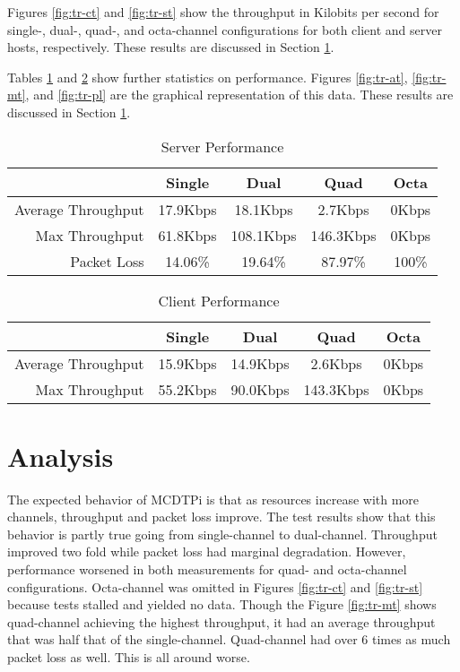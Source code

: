 Figures \ref{fig:tr-ct} and \ref{fig:tr-st} show the throughput in Kilobits per second for single-, dual-, quad-, and octa-channel configurations for both client and server hosts, respectively. These results are discussed in Section \ref{sec:anlys}.

Tables \ref{tab:server-perf} and \ref{tab:client-perf} show further statistics on performance. Figures \ref{fig:tr-at}, \ref{fig:tr-mt}, and \ref{fig:tr-pl} are the graphical representation of this data. These results are discussed in Section \ref{sec:anlys}.

\begin{table}[H]
\centering
\caption{Server Performance}
\label{tab:server-perf}
\begin{tabular}{rcccc}
\multicolumn{1}{c}{} & Single    & Dual      & Quad       & Octa  \\
\hline
Average Throughput   & 17.9Kbps  & 18.1Kbps  & 2.7Kbps    & 0Kbps \\
\hline
Max Throughput       & 61.8Kbps  & 108.1Kbps & 146.3Kbps  & 0Kbps \\
\hline
Packet Loss          & 14.06\%   & 19.64\%   & 87.97\%    & 100\%
\end{tabular}
\end{table}

\begin{table}[H]
\centering
\caption{Client Performance}
\label{tab:client-perf}
\begin{tabular}{rcccc}
\multicolumn{1}{c}{} & Single    & Dual      & Quad       & Octa  \\
\hline
Average Throughput   & 15.9Kbps  & 14.9Kbps  & 2.6Kbps    & 0Kbps \\
\hline
Max Throughput       & 55.2Kbps  & 90.0Kbps  & 143.3Kbps  & 0Kbps
\end{tabular}
\end{table}


\section{Analysis}\label{sec:anlys}

The expected behavior of MCDTPi is that as resources increase with more channels, throughput and packet loss improve. The test results show that this behavior is partly true going from single-channel to dual-channel. Throughput improved two fold while packet loss had marginal degradation. However, performance worsened in both measurements for quad- and octa-channel configurations. Octa-channel was omitted in Figures \ref{fig:tr-ct} and \ref{fig:tr-st} because tests stalled and yielded no data. Though the Figure \ref{fig:tr-mt} shows quad-channel achieving the highest throughput, it had an average throughput that was half that of the single-channel. Quad-channel had over 6 times as much packet loss as well. This is all around worse.

